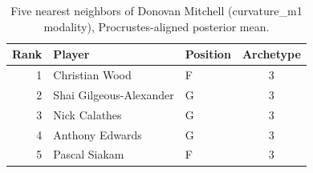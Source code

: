 \begin{table}[htbp]
  \centering\small
  \begin{tabular}{rllc}
    \toprule
    Rank & Player & Position & Archetype \\
    \midrule
    1 & Christian Wood & F & 3 \\
    2 & Shai Gilgeous-Alexander & G & 3 \\
    3 & Nick Calathes & G & 3 \\
    4 & Anthony Edwards & G & 3 \\
    5 & Pascal Siakam & F & 3 \\
    \bottomrule
  \end{tabular}
  \caption{Five nearest neighbors of Donovan Mitchell (curvature_m1 modality), Procrustes-aligned posterior mean.}
  \label{tab:Donovan_Mitchell_neighbors_curvature_m1}
\end{table}

